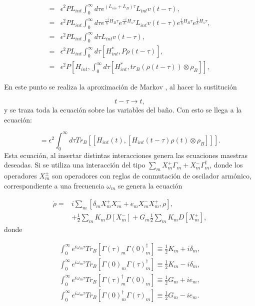 \documentclass[a4paper,10pt]{report}
\begin{document}
\begin{align*}
=& \epsilon^2 PL_{int} \int_{0}^{\infty}d\tau e^{(L_{sis}+L_{B})\tau}L_{int}v(t-\tau),\\
=& \epsilon^2 PL_{int} \int_{0}^{\infty}d\tau e^{\frac{-i}{\hbar}H_B\tau}e^{\frac{-i}{\hbar}H_s\tau}L_{int}v(t-\tau)e^{\frac{i}{\hbar}H_B\tau}e^{\frac{i}{\hbar}H_s\tau},\\
=&\epsilon^2 PL_{int} \int_{0}^{\infty}d\tau L_{int}v(t-\tau), \\
=&\epsilon^2 PL_{int} \int_{0}^{\infty}d\tau[H_{int}^*,P\rho(t-\tau)], \\
=&\epsilon^2 P[H_{int},\int_{0}^{\infty}d\tau[H_{int}^*,tr_B(\rho(t-\tau))\otimes\rho_B]],
\end{align*}

En este punto se realiza la aproximación de Markov \cite{ZollerQN}, al hacer la sustitución

\begin{equation}
t-\tau \rightarrow t,
\end{equation} y se traza toda la ecuación sobre las variables del baño. Con esto se llega a la ecuación:

\begin{equation}
=\epsilon^2 \int_{0}^{\infty}d\tau Tr_B[[H_{int}(t),[H_{int}(t-\tau)\rho(t)\otimes\rho_B]]].
\end{equation} Esta ecuación, al insertar distintas interacciones genera las ecuaciones maestras deseadas. Si se utiliza una interacción del tipo $\sum_m X^+_m\Gamma_m + X^-_m\Gamma^\dagger_m$, donde los operadores $X_m^\pm$ son operadores con reglas de conmutación de oscilador armónico, correspondiente a una frecuencia $\omega_m$ se genera la ecuación \cite{ZollerQN}

\begin{align}
\dot{\rho} =& i\sum_m [\delta_m X^+_m X^-_m + e_mX^-_mX^+_m,\rho],\\
&+ \nonumber \frac{1}{2}\sum_m K_m D[X^-_m] + G_m\frac{1}{2}\sum_m K_m D[X^+_m],
\end{align} donde

\begin{align}
\int_0 ^\infty e^{i\omega_m \tau}Tr_B[\Gamma(\tau)_m\Gamma(0)^\dagger_m] \equiv \frac{1}{2}K_m+i\delta_m,\\
\int_0 ^\infty e^{i\omega_m \tau}Tr_B[\Gamma(0)_m\Gamma(\tau)^\dagger_m]\equiv \frac{1}{2}K_m-i\delta_m,\\
\int_0 ^\infty e^{i\omega_m \tau}Tr_B[\Gamma(\tau)^\dagger_m\Gamma(0)_m]\equiv\frac{1}{2}G_m+ie_m,\\
\int_0 ^\infty e^{i\omega_m \tau}Tr_B[\Gamma(0)^\dagger_m\Gamma(\tau)_m]\equiv\frac{1}{2}G_m-ie_m.
\end{align}
\end{document}
